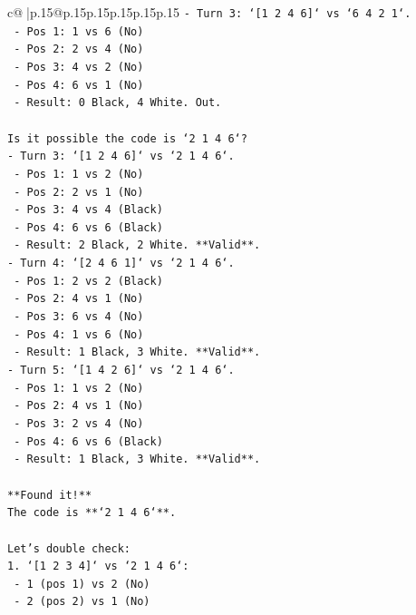 \documentclass{article}
\begin{document}
{\begin{supertabular}{c@{$\;$}|p{.15\linewidth}@{}p{.15\linewidth}p{.15\linewidth}p{.15\linewidth}p{.15\linewidth}p{.15\linewidth}}
{{{\texttt{{-} Turn 3: `{[}1 2 4 6{]}` vs `6 4 2 1`.} \\
\texttt{  {-} Pos 1: 1 vs 6 (No)} \\
\texttt{  {-} Pos 2: 2 vs 4 (No)} \\
\texttt{  {-} Pos 3: 4 vs 2 (No)} \\
\texttt{  {-} Pos 4: 6 vs 1 (No)} \\
\texttt{  {-} Result: 0 Black, 4 White. Out.} \\
\\ 
\texttt{Is it possible the code is `2 1 4 6`?} \\
\texttt{{-} Turn 3: `{[}1 2 4 6{]}` vs `2 1 4 6`.} \\
\texttt{  {-} Pos 1: 1 vs 2 (No)} \\
\texttt{  {-} Pos 2: 2 vs 1 (No)} \\
\texttt{  {-} Pos 3: 4 vs 4 (Black)} \\
\texttt{  {-} Pos 4: 6 vs 6 (Black)} \\
\texttt{  {-} Result: 2 Black, 2 White. **Valid**.} \\
\texttt{{-} Turn 4: `{[}2 4 6 1{]}` vs `2 1 4 6`.} \\
\texttt{  {-} Pos 1: 2 vs 2 (Black)} \\
\texttt{  {-} Pos 2: 4 vs 1 (No)} \\
\texttt{  {-} Pos 3: 6 vs 4 (No)} \\
\texttt{  {-} Pos 4: 1 vs 6 (No)} \\
\texttt{  {-} Result: 1 Black, 3 White. **Valid**.} \\
\texttt{{-} Turn 5: `{[}1 4 2 6{]}` vs `2 1 4 6`.} \\
\texttt{  {-} Pos 1: 1 vs 2 (No)} \\
\texttt{  {-} Pos 2: 4 vs 1 (No)} \\
\texttt{  {-} Pos 3: 2 vs 4 (No)} \\
\texttt{  {-} Pos 4: 6 vs 6 (Black)} \\
\texttt{  {-} Result: 1 Black, 3 White. **Valid**.} \\
\\ 
\texttt{**Found it!**} \\
\texttt{The code is **`2 1 4 6`**.} \\
\\ 
\texttt{Let's double check:} \\
\texttt{1. `{[}1 2 3 4{]}` vs `2 1 4 6`:} \\
\texttt{   {-} 1 (pos 1) vs 2 (No)} \\
\texttt{   {-} 2 (pos 2) vs 1 (No)} \\
}}}
\end{supertabular}}
\end{document}
